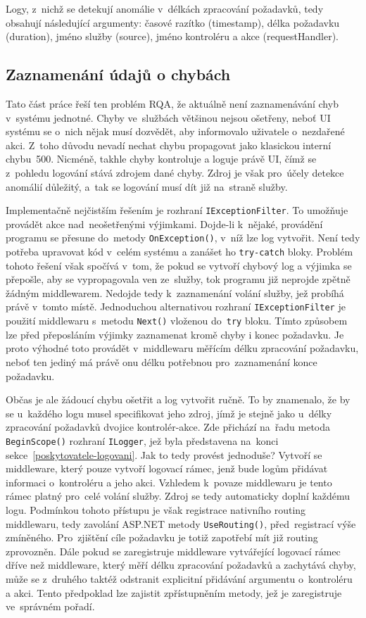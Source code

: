 Logy, z~nichž se detekují anomálie v~délkách zpracování požadavků, tedy obsahují následující argumenty: časové razítko (timestamp), délka požadavku (duration), jméno služby (source), jméno kontroléru a akce (requestHandler).

\subsection{Zaznamenání údajů o chybách}
\label{zaznamenani-udaju-o-chybach}
Tato část práce řeší ten problém RQA, že aktuálně není zaznamenávání chyb v~systému jednotné. Chyby ve~službách většinou nejsou ošetřeny, neboť UI systému se o~nich nějak musí dozvědět, aby informovalo uživatele o~nezdařené akci. Z~toho důvodu nevadí nechat chybu propagovat jako klasickou interní chybu~500. Nicméně, takhle chyby kontroluje a loguje právě UI, čímž se z~pohledu logování stává zdrojem dané chyby. Zdroj je však pro~účely detekce anomálií důležitý, a~tak se logování musí dít již na~straně služby.

Implementačně nejčistším řešením je rozhraní \texttt{IExceptionFilter}. To umožňuje provádět akce nad~neošetřenými výjimkami. Dojde-li k~nějaké, provádění programu se přesune do~metody \texttt{OnException()}, v~níž lze log vytvořit. Není tedy potřeba upravovat kód v~celém systému a zanášet ho \texttt{try-catch} bloky. Problém tohoto řešení však spočívá v~tom, že pokud se vytvoří chybový log a výjimka se přepošle, aby se vypropagovala ven ze~služby, tok programu již neprojde zpětně žádným middlewarem. Nedojde tedy k~zaznamenání volání služby, jež probíhá právě v~tomto místě. Jednoduchou alternativou rozhraní \texttt{IExceptionFilter} je použití middlewaru s~metodu \texttt{Next()} vloženou do~\texttt{try} bloku. Tímto způsobem lze před přeposláním výjimky zaznamenat kromě chyby i konec požadavku. Je proto výhodné toto provádět v~middlewaru měřícím délku zpracování požadavku, neboť ten jediný má právě onu délku potřebnou pro~zaznamenání konce požadavku.

Občas je ale žádoucí chybu ošetřit a log vytvořit ručně. To by znamenalo, že by se u~každého logu musel specifikovat jeho zdroj, jímž je stejně jako u~délky zpracování požadavků dvojice kontrolér-akce. Zde přichází na~řadu metoda \texttt{BeginScope()} rozhraní \texttt{ILogger}, jež byla představena na~konci sekce~\ref{poskytovatele-logovani}. Jak to tedy provést jednoduše? Vytvoří se middleware, který pouze vytvoří logovací rámec, jenž bude logům přidávat informaci o~kontroléru a jeho akci. Vzhledem k~povaze middlewaru je tento rámec platný pro~celé volání služby. Zdroj se tedy automaticky doplní každému logu. Podmínkou tohoto přístupu je však registrace nativního routing middlewaru, tedy zavolání ASP.NET metody \texttt{UseRouting()}, před~registrací výše zmíněného. Pro~zjištění cíle požadavku je totiž zapotřebí mít již routing zprovozněn. Dále pokud se zaregistruje middleware vytvářející logovací rámec dříve než middleware, který měří délku zpracování požadavků a zachytává chyby, může se z~druhého taktéž odstranit explicitní přidávání argumentu o~kontroléru a akci. Tento předpoklad lze zajistit zpřístupněním metody, jež je zaregistruje ve~správném pořadí.

